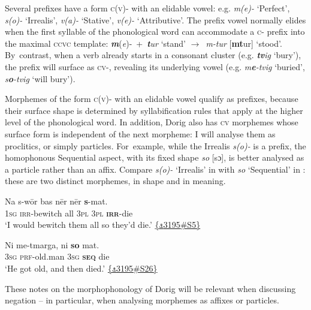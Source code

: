 \documentclass[output=paper,colorlinks,citecolor=brown,draft]{langscibook}
\begin{document}
Several prefixes have a form \textsc{c(v)}- with an elidable vowel: e.g. \textit{m(e)-} ‘Perfect’, \textit{s(o)-} ‘Irrealis’, \textit{v(a)-} ‘Stative’, \textit{v(e)-} ‘Attributive’. The prefix vowel normally elides when the first syllable of the phonological word can accommodate a \textsc{c-} prefix into the maximal \textsc{ccvc} template: \textbf{\textit{m}}(\textit{e})-~+~\textbf{\textit{t}}\textit{ur} ‘stand’ \textrm{${\rightarrow}$}~\textit{m-tur} [\textbf{mt}ur] ‘stood’. By~contrast, when a verb already starts in a consonant cluster (e.g. \textbf{\textit{tv}}\textit{ig} ‘bury’), the prefix will surface as \textsc{cv-}, revealing its underlying vowel (e.g. \textit{m}\textbf{\textit{e}}\textit{-tvig} ‘buried’,\textit{ s}\textbf{\textit{o}}\textit{-tvig} ‘will bury’). 

Morphemes of the form \textsc{c(v)}- with an elidable vowel qualify as prefixes, because their surface shape is determined by syllabification rules that apply at the higher level of the phonological word. In addition, Dorig also has \textsc{cv} morphemes whose surface form is independent of the next morpheme: I will analyse them as proclitics, or simply particles. For~example, while the Irrealis \textit{s(o)-} is a prefix, the homophonous Sequential aspect, with its fixed shape \textit{so} [sɔ], is better analysed as a particle rather than an affix. Compare \textit{s(o)-} ‘Irrealis’ in  with \textit{so} ‘Sequential’ in : these are two distinct morphemes, in shape and in meaning.
    
\ea\label{ex:dor:bewitch} 
    \gll Na s-wōr bas nēr nēr \textbf{s}-mat.\\   
         \textsc{1sg} \textsc{irr}-bewitch all \textsc{3pl} \textsc{3pl} \textbf{\textsc{irr}}-die \\
    \glt ‘I would bewitch them all so they’d die.’ \quad  \href{https://doi.org/10.24397/pangloss-0003195#S5}{\{\texttt{⚓}3195\#S5\}} 
\z 

\ea\label{ex:dor:old} 
    \gll   Ni me-tmarga, ni \textbf{so} mat.\\  
          \textsc{3sg} \textsc{prf}-old.man \textsc{3sg} \textbf{\textsc{seq}} die\\
    \glt ‘He got old, and then died.’ \quad   \href{https://doi.org/10.24397/pangloss-0003195#S26}{\{\texttt{⚓}3195\#S26\}}
\z 

\noindent These notes on the morphophonology of Dorig will be relevant when \mbox{discussing} negation – in particular, when analysing morphemes as affixes or \mbox{particles}.
\end{document}
